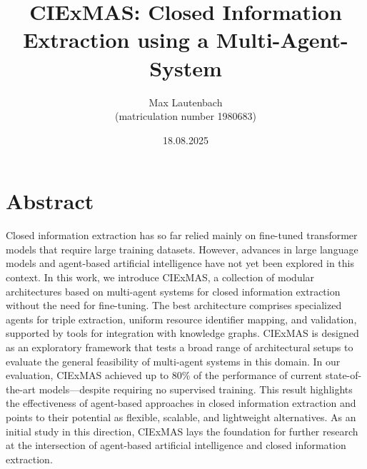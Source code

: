 \documentclass[a4paper,oneside,bibliography=totoc]{scrbook}
\begin{document}
\frontmatter
\subject{Master Thesis}
\title{CIExMAS: Closed Information Extraction using a Multi-Agent-System}
\author{Max Lautenbach\\
  (matriculation number 1980683)}
\date{18.08.2025}
\publishers{{\small Submitted to}\\
  Data and Web Science Group\\
  Dr.\ Sven Hertling\\
  University of Mannheim\\}
\maketitle

\chapter{Abstract}

Closed information extraction has so far relied mainly on fine-tuned transformer models that require large training datasets. However, advances in large language models and agent-based artificial intelligence have not yet been explored in this context. In this work, we introduce CIExMAS, a collection of modular architectures based on multi-agent systems for closed information extraction without the need for fine-tuning. The best architecture comprises specialized agents for triple extraction, uniform resource identifier mapping, and validation, supported by tools for integration with knowledge graphs. CIExMAS is designed as an exploratory framework that tests a broad range of architectural setups to evaluate the general feasibility of multi-agent systems in this domain. In our evaluation, CIExMAS achieved up to 80\% of the performance of current state-of-the-art models—despite requiring no supervised training. This result highlights the effectiveness of agent-based approaches in closed information extraction and points to their potential as flexible, scalable, and lightweight alternatives. As an initial study in this direction, CIExMAS lays the foundation for further research at the intersection of agent-based artificial intelligence and closed information extraction.

\begingroup%
\hypersetup{hidelinks}%
\tableofcontents%
\endgroup

\begingroup%
\hypersetup{hidelinks}%
\listoffigures%
\endgroup

\begingroup%
\hypersetup{hidelinks}%
\listoftables%
\endgroup
\end{document}
